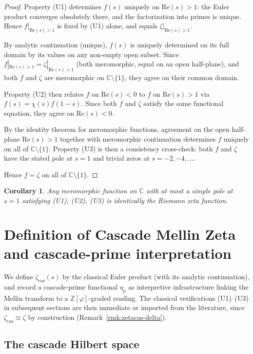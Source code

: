 \documentclass[11pt, a4paper]{amsart}
\newtheorem{corollary}[theorem]{Corollary}
\theoremstyle{definition}
\newcommand{\Z}{\mathbb{Z}}
\newcommand{\C}{\mathbb{C}}
\newcommand{\pphi}{\varphi}
\newcommand{\zetacas}{\zeta_{\mathrm{cas}}}
\begin{document}
\begin{proof}
Property (U1) determines $f(s)$ uniquely on $\mathrm{Re}(s) > 1$:
the Euler product converges absolutely there, and the factorization
into primes is unique. Hence $f|_{\mathrm{Re}(s) > 1}$ is fixed
by (U1) alone, and equals $\zeta|_{\mathrm{Re}(s) > 1}$.

By analytic continuation (unique), $f(s)$ is uniquely determined on
its full domain by its values on any non-empty open subset. Since
$f|_{\mathrm{Re}(s) > 1} = \zeta|_{\mathrm{Re}(s) > 1}$ (both
meromorphic, equal on an open half-plane), and both $f$ and $\zeta$
are meromorphic on $\C \setminus \{1\}$, they agree on their common
domain.

Property (U2) then relates $f$ on $\mathrm{Re}(s) < 0$ to $f$ on
$\mathrm{Re}(s) > 1$ via $f(s) = \chi(s) f(1-s)$. Since both $f$
and $\zeta$ satisfy the same functional equation, they agree on
$\mathrm{Re}(s) < 0$.

By the identity theorem for meromorphic functions, agreement on
the open half-plane $\mathrm{Re}(s) > 1$ together with meromorphic
continuation determines $f$ uniquely on all of
$\C \setminus \{1\}$.  Property (U3) is then a consistency
cross-check: both $f$ and $\zeta$ have the stated pole at $s = 1$
and trivial zeros at $s = -2, -4, \ldots$.

Hence $f = \zeta$ on all of $\C \setminus \{1\}$.
\end{proof}

\begin{corollary}\label{cor:unique}
Any meromorphic function on $\C$ with at most a simple pole at
$s = 1$ satisfying (U1), (U2), (U3) is identically the Riemann zeta
function.
\end{corollary}

\section{Definition of Cascade Mellin Zeta and cascade-prime
interpretation}\label{sec:construction}

We define $\zetacas(s)$ by the classical Euler product (with its
analytic continuation), and record a cascade-prime functional
$\eta_p$ as interpretive infrastructure linking the Mellin
transform to a $\Z[\pphi]$-graded reading.  The classical
verifications (U1)--(U3) in subsequent sections are then immediate
or imported from the literature, since $\zetacas \equiv \zeta$ by
construction (Remark~\ref{rmk:zetacas-delta}).

\subsection{The cascade Hilbert space}
\end{document}
